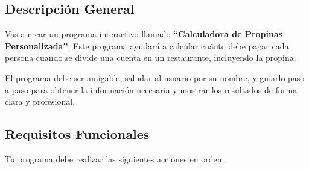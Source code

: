 \documentclass[12pt,a4paper]{article}
\begin{document}
\subsection{Descripción General}

Vas a crear un programa interactivo llamado \textbf{``Calculadora de Propinas Personalizada''}. Este programa ayudará a calcular cuánto debe pagar cada persona cuando se divide una cuenta en un restaurante, incluyendo la propina.

El programa debe ser amigable, saludar al usuario por su nombre, y guiarlo paso a paso para obtener la información necesaria y mostrar los resultados de forma clara y profesional.

\subsection{Requisitos Funcionales}

Tu programa debe realizar las siguientes acciones en orden:
\end{document}
